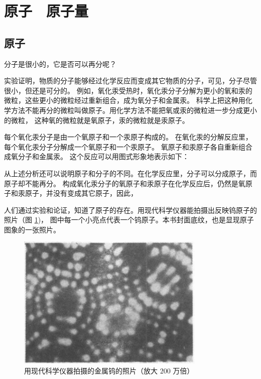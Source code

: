 \section{原子　原子量}\label{sec:1-5}

\subsection{原子}

分子是很小的，它是否可以再分呢？

实验证明，物质的分子能够经过化学反应而变成其它物质的分子，可见，分子尽管很小，但还是可分的。
例如，氧化汞受热时，氧化汞分子分解为更小的氧和汞的微粒，这些更小的微粒经过重新组合，成为氧分子和金属汞。
科学上把这种用化学方法不能再分的微粒叫做原子。用化学方法不能把氧或汞的微粒进一步分成更小的微粒，
这种氧的微粒就是氧原子，汞的微粒就是汞原子。

每个氧化汞分子是由一个氧原子和一个汞原子构成的。
在氧化汞的分解反应里，每个氧化汞分子分解成一个氧原子和一个汞原子。
氧原子和汞原子各自重新组合成氧分子和金属汞。
这个反应可以用图式形象地表示如下：

\begin{figure}[htbp]
    \centering
    
\end{figure}


从上述分析还可以说明原子和分子的不同。在化学反应里，分子可以分成原子，而原子却不能再分。
构成氧化汞分子的氧原子和汞原子在化学反应后，仍然是氧原子和汞原子，并没有变成其它原子，因此，

人们通过实验和论证，知道了原子的存在。用现代科学仪器能拍摄出反映钨原子的照片（图 \ref{fig:1-11})，
图中每一个小亮点代表一个钨原子。本书封面底纹，也是显现原子图象的一张照片。

\begin{figure}[htbp]
    \centering
    \includegraphics[width=9cm]{../pic/czhx1-ch1-11}
    \caption{用现代科学仪器拍摄的金属钨的照片（放大 $200$ 万倍）}\label{fig:1-11}
\end{figure}

